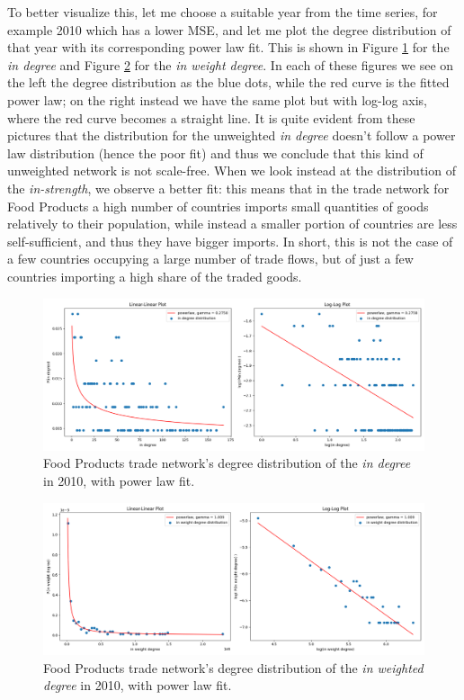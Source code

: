 To better visualize this, let me choose a suitable year from the time series, for example 2010 which has a lower MSE, and let me plot the degree distribution of that year with its corresponding power law fit. This is shown in Figure \ref{fig:plfood} for the \textit{in degree} and Figure \ref{fig:plfoodw} for the \textit{in weight degree}. In each of these figures we see on the left the degree distribution as the blue dots, while the red curve is the fitted power law; on the right instead we have the same plot but with log-log axis, where the red curve becomes a straight line.
It is quite evident from these pictures that the distribution for the unweighted \textit{in degree} doesn't follow a power law distribution (hence the poor fit) and thus we conclude that this kind of unweighted network is not scale-free. When we look instead at the distribution of the \textit{in-strength}, we observe a better fit: this means that in the trade network for Food Products a high number of countries imports small quantities of goods relatively to their population, while instead a smaller portion of countries are less self-sufficient, and thus they have bigger imports. In short, this is not the case of a few countries occupying a large number of trade flows, but of just a few countries importing a high share of the traded goods.

\begin{figure}
    \centering
    \includegraphics[width=\textwidth]{pics/powerlaw_in_degree_p10_y2010.png}
    \caption{Food Products trade network's degree distribution of the \textit{in degree} in 2010, with power law fit.}
    \label{fig:plfood}
\end{figure}

\begin{figure}
    \centering
    \includegraphics[width=\textwidth]{pics/powerlaw_in_weight_degree_p10_y2010.png}
    \caption{Food Products trade network's degree distribution of the \textit{in weighted degree} in 2010, with power law fit.}
    \label{fig:plfoodw}
\end{figure}

